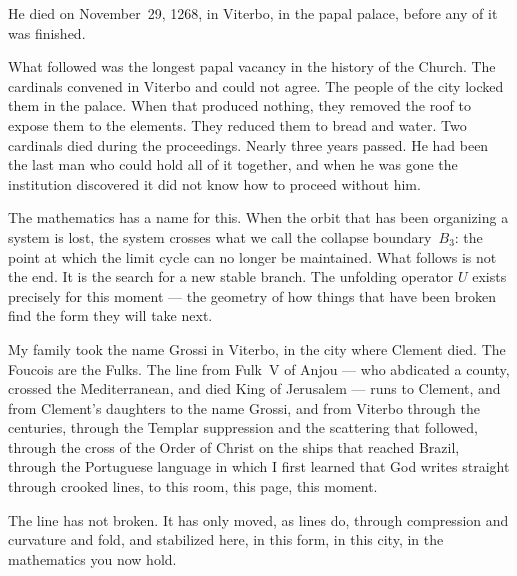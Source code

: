 \vspace{0.45cm}

\noindent He died on November~29, 1268, in Viterbo,
in the papal palace, before any of it was finished.

\vspace{0.45cm}

\noindent What followed was the longest papal vacancy
in the history of the Church.
The cardinals convened in Viterbo and could not agree.
The people of the city locked them in the palace.
When that produced nothing, they removed the roof
to expose them to the elements.
They reduced them to bread and water.
Two cardinals died during the proceedings.
Nearly three years passed.
He had been the last man who could hold
all of it together, and when he was gone
the institution discovered it did not know
how to proceed without him.

\vspace{0.45cm}

\noindent The mathematics has a name for this.
When the orbit that has been organizing
a system is lost, the system crosses what
we call the collapse boundary~$B_3$:
the point at which the limit cycle
can no longer be maintained.
What follows is not the end.
It is the search for a new stable branch.
The unfolding operator $U$ exists
precisely for this moment ---
the geometry of how things that have
been broken find the form
they will take next.

\vspace{0.45cm}

\noindent My family took the name Grossi in Viterbo,
in the city where Clement died.
The Foucois are the Fulks.
The line from Fulk~V of Anjou ---
who abdicated a county, crossed the Mediterranean,
and died King of Jerusalem ---
runs to Clement, and from Clement's daughters
to the name Grossi, and from Viterbo
through the centuries, through the Templar
suppression and the scattering that followed,
through the cross of the Order of Christ
on the ships that reached Brazil,
through the Portuguese language in which
I first learned that God writes straight
through crooked lines,
to this room, this page, this moment.

\vspace{0.45cm}

\noindent The line has not broken.
It has only moved, as lines do,
through compression and curvature
and fold, and stabilized here,
in this form, in this city,
in the mathematics you now hold.

\vspace{0.45cm}

